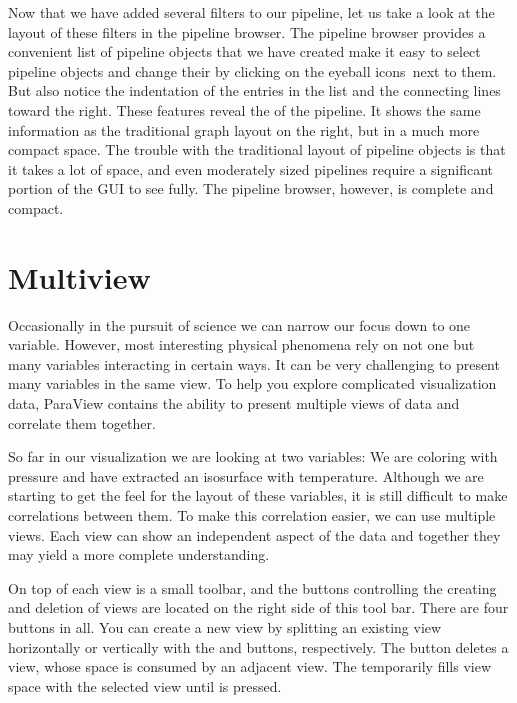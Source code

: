 Now that we have added several filters to our pipeline, let us take a look
at the layout of these filters in the pipeline browser.  The pipeline
browser provides a convenient list of pipeline objects that we have created
make it easy to select pipeline objects and change their
 by clicking on the eyeball icons~\eyeball next to
them.  But also notice the indentation of the entries in the list and the
connecting lines toward the right.  These features reveal the
 of the pipeline.  It shows the same information as
the traditional graph layout on the right, but in a much more compact
space.  The trouble with the traditional layout of pipeline objects is that
it takes a lot of space, and even moderately sized pipelines require a
significant portion of the GUI to see fully.  The pipeline browser,
however, is complete and compact.


\section{Multiview}
\label{sec:Multiview}

Occasionally in the pursuit of science we can narrow our focus down to one
variable.  However, most interesting physical phenomena rely on not one but
many variables interacting in certain ways.  It can be very challenging to
present many variables in the same view.  To help you explore complicated
visualization data, ParaView contains the ability to present multiple views
of data and correlate them together.

So far in our visualization we are looking at two variables: We are
coloring with pressure and have extracted an isosurface with temperature.
Although we are starting to get the feel for the layout of these variables,
it is still difficult to make correlations between them.  To make this
correlation easier, we can use multiple views.  Each view can show an
independent aspect of the data and together they may yield a more complete
understanding.

On top of each view is a small toolbar, and the buttons controlling the
creating and deletion of views are located on the right side of this tool
bar.  There are four buttons in all.  You can create a new view by
splitting an existing view horizontally or vertically with the \splitViewH
and \splitViewV buttons, respectively.  The \deleteView button deletes a
view, whose space is consumed by an adjacent view.  The \maximizeView
temporarily fills view space with the selected view until \restoreView is
pressed.

